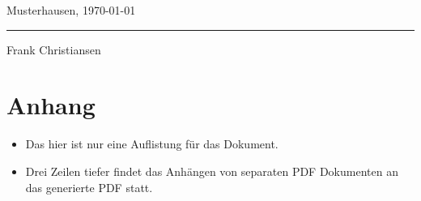 \documentclass[a4paper, 12pt]{article}
\newcommand{\haAutor}{Frank Christiansen}
\newcommand{\haAutorOrt}{Musterhausen}
\begin{document}
\vspace{2 cm}

\haAutorOrt, \today

\vspace{1 cm}

\parbox{5cm}{\hrule
\strut \footnotesize \haAutor}


\vfill
\section*{Anhang}
\begin{itemize}
\item Das hier ist nur eine Auflistung für das Dokument.
\item Drei Zeilen tiefer findet das Anhängen von separaten PDF Dokumenten an das generierte PDF statt.
\end{itemize}


\end{document}
